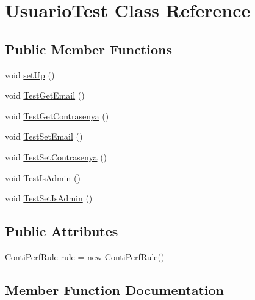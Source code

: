 \hypertarget{class_usuario_test}{}\section{Usuario\+Test Class Reference}
\label{class_usuario_test}
\subsection*{Public Member Functions}
\begin{DoxyCompactItemize}
\item 
void \mbox{\hyperlink{class_usuario_test_a266ea2808c28dc0e7a012f5145f5a09d}{set\+Up}} ()
\item 
void \mbox{\hyperlink{class_usuario_test_a1edbba82e373eca6120a82cf9e35ab69}{Test\+Get\+Email}} ()
\item 
void \mbox{\hyperlink{class_usuario_test_af7931a1dbcf5d80d80ffb49c30306ab7}{Test\+Get\+Contrasenya}} ()
\item 
void \mbox{\hyperlink{class_usuario_test_afaeecf0b39295c30dfb136b4e6dbbb29}{Test\+Set\+Email}} ()
\item 
void \mbox{\hyperlink{class_usuario_test_ae54ab8d6508da5377f7b40a9df5865ff}{Test\+Set\+Contrasenya}} ()
\item 
void \mbox{\hyperlink{class_usuario_test_a19d128d4d51d608e2445eee6b6f32254}{Test\+Is\+Admin}} ()
\item 
void \mbox{\hyperlink{class_usuario_test_aee4f852120d2d90c77aba4e21edb0ad6}{Test\+Set\+Is\+Admin}} ()
\end{DoxyCompactItemize}
\subsection*{Public Attributes}
\begin{DoxyCompactItemize}
\item 
Conti\+Perf\+Rule \mbox{\hyperlink{class_usuario_test_ab80cbde6eaaf783c116fdafdaa07bde9}{rule}} = new Conti\+Perf\+Rule()
\end{DoxyCompactItemize}


\subsection{Member Function Documentation}
\mbox{\label{class_usuario_test_a266ea2808c28dc0e7a012f5145f5a09d}} 
